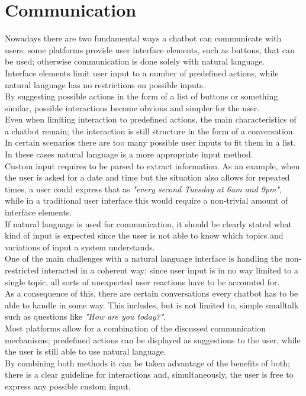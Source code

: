 \section{Communication}
\label{communication}


Nowadays there are two fundamental ways a chatbot can communicate with users;
some platforms provide user interface elements, such as buttons, that can be used;
otherwise communication is done solely with natural language.
\\

Interface elements limit user input to a number of predefined actions,
while natural language has no restrictions on possible inputs.
\\
By suggesting possible actions in the form of a list of buttons or something similar,
possible interactions become obvious and simpler for the user.
\\
Even when limiting interaction to predefined actions,
the main characteristics of a chatbot remain;
the interaction is still structure in the form of a conversation.
\\

In certain scenarios there are too many possible user inputs to fit them in a list.
In these cases natural language is a more appropriate input method.
\\
Custom input requires to be parsed to extract information.
As an example, when the user is asked for a date and time but the situation also allows for repeated times,
a user could express that as \emph{"every second Tuesday at 6am and 9pm"},
while in a traditional user interface this would require a non-trivial amount of interface elements.
\\

If natural language is used for communication,
it should be clearly stated what kind of input is expected
since the user is not able to know which topics and variations of input a system understands.
\\
One of the main challenges with a natural language interface is handling the non-restricted interacted
in a coherent way;
since user input is in no way limited to a single topic,
all sorts of unexpected user reactions have to be accounted for.
\\
As a consequence of this, there are certain conversations every chatbot has to be able to handle in some way.
This includes, but is not limited to, simple smalltalk such as questions like \emph{"How are you today?"}.
\\

Most platforms allow for a combination of the discussed communication mechanisms;
predefined actions can be displayed as suggestions to the user,
while the user is still able to use natural language.
\\
By combining both methods it can be taken advantage of the benefits of both;
there is a clear guideline for interactions and, simultaneously,
the user is free to express any possible custom input.
